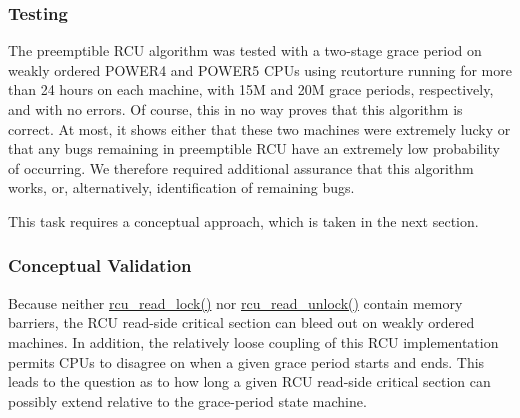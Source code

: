 \subsubsection{Testing}
\label{app:rcuimpl:Testing}

The preemptible RCU algorithm was tested with a two-stage grace period
on weakly ordered POWER4 and POWER5 CPUs using rcutorture running for
more than 24 hours on each machine, with 15M and 20M grace periods,
respectively, and with no errors.
Of course, this in no way proves that this algorithm is correct.
At most, it shows either that these two machines were extremely
lucky or that any bugs remaining in preemptible RCU have an extremely
low probability of occurring.
We therefore required additional assurance that this algorithm works,
or, alternatively, identification of remaining bugs.

This task requires a conceptual approach,
which is taken in the next section.

\subsubsection{Conceptual Validation}
\label{app:rcuimpl:Conceptual Validation}

Because neither \url{rcu_read_lock()} nor \url{rcu_read_unlock()}
contain memory barriers, the RCU read-side critical section can bleed
out on weakly ordered machines.
In addition, the relatively loose coupling of this RCU implementation
permits CPUs to disagree on when a given grace period starts and ends.
This leads to the question as to how long a given RCU read-side critical
section can possibly extend relative to the grace-period state machine.

